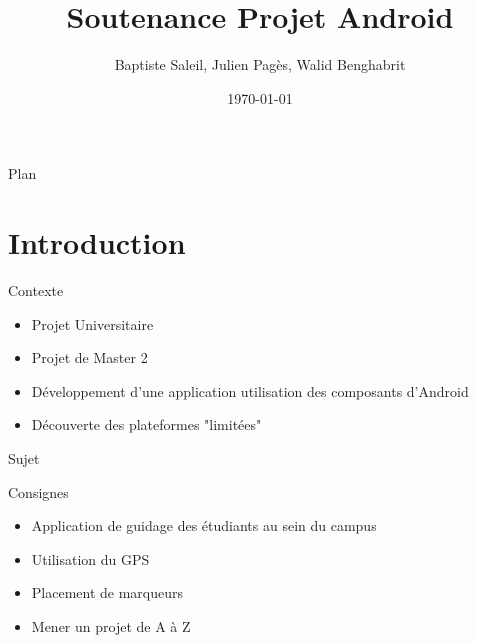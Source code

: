 \documentclass{beamer}
\title{Soutenance Projet Android}
\author{Baptiste Saleil, Julien Pagès, Walid Benghabrit}
\date{\today}
\begin{document}
	\begin{frame}
		\titlepage
	\end{frame}

	\begin{frame}{Plan}
		\tableofcontents
	\end{frame}

	\section{Introduction}
		\begin{frame}{Contexte}
			\begin{itemize}
				\item Projet Universitaire
				\item Projet de Master 2
				\item Développement d'une application utilisation des composants d'Android
				\item Découverte des plateformes "limitées"
			\end{itemize}
		\end{frame}
		
		\begin{frame}{Sujet}
			\begin{exampleblock}{Consignes}
			\begin{itemize}
				\item Application de guidage des étudiants au sein du campus 
				\item Utilisation du GPS
				\item Placement de marqueurs
				\item Mener un projet de A à Z
			\end{itemize}
			\end{exampleblock}
		\end{frame}
		
\end{document}
